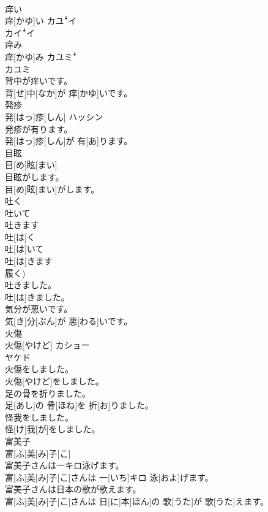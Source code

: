\documentclass[8pt]{extreport}
\begin{document}
\begin{CJK}{UTF8}{min}
\\	痒い	
\\	痒[かゆ]い	カユꜜイ 
\\	カイꜜイ
\\	痒み	
\\	痒[かゆ]み	カユミꜜ 
\\	カユミ
\\	背中が痒いです。	
\\	背[せ]中[なか]が 痒[かゆ]いです。
\\	発疹	
\\	発[はっ]疹[しん]	ハッシン
\\	発疹が有ります。	
\\	発[はっ]疹[しん]が 有[あ]ります。
\\	目眩	
\\	目[め]眩[まい]	
\\	目眩がします。	
\\	目[め]眩[まい]がします。
\\	吐く 
\\	吐いて 
\\	吐きます	
\\	吐[は]く 
\\	吐[は]いて 
\\	吐[は]きます 
\\	履く)	
\\	吐きました。	
\\	吐[は]きました。	
\\	気分が悪いです。	
\\	気[き]分[ぶん]が 悪[わる]いです。
\\	火傷	
\\	火傷[やけど]	カショー 
\\	ヤケド
\\	火傷をしました。	
\\	火傷[やけど]をしました。
\\	足の骨を折りました。	
\\	足[あし]の 骨[ほね]を 折[お]りました。	
\\	怪我をしました。	
\\	怪[け]我[が]をしました。	
\\	富美子	
\\	富[ふ]美[み]子[こ]	
\\	富美子さんは一キロ泳げます。	
\\	富[ふ]美[み]子[こ]さんは 一[いち]キロ 泳[およ]げます。
\\	富美子さんは日本の歌が歌えます。	
\\	富[ふ]美[み]子[こ]さんは 日[に]本[ほん]の 歌[うた]が 歌[うた]えます。

\end{CJK}
\end{document}
